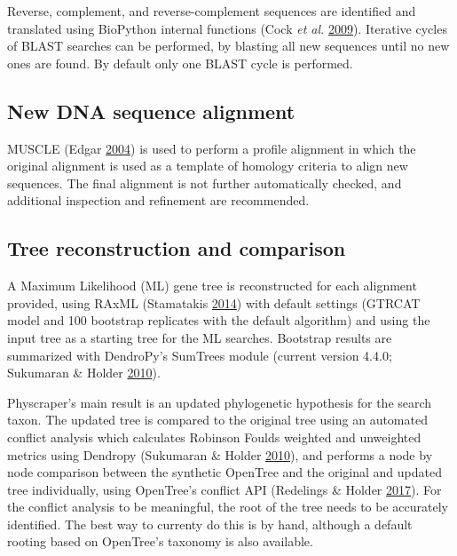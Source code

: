 \documentclass[]{article}
\begin{document}
Reverse, complement, and reverse-complement sequences are identified and translated using BioPython internal functions (Cock \emph{et al.} \protect\hyperlink{ref-cock2009biopython}{2009}).
Iterative cycles of BLAST searches can be performed, by blasting all new sequences until no new ones are found. By default only one BLAST cycle is performed.

\hypertarget{new-dna-sequence-alignment}{%
\subsection{New DNA sequence alignment}\label{new-dna-sequence-alignment}}

MUSCLE (Edgar \protect\hyperlink{ref-edgar2004muscle}{2004}) is used to perform a profile alignment in which the original alignment is used as a template of homology criteria to align new sequences.
The final alignment is not further automatically checked, and additional inspection and refinement are recommended.

\hypertarget{tree-reconstruction-and-comparison}{%
\subsection{Tree reconstruction and comparison}\label{tree-reconstruction-and-comparison}}

A Maximum Likelihood (ML) gene tree is reconstructed for each alignment provided, using RAxML (Stamatakis \protect\hyperlink{ref-stamatakis2014raxml}{2014}) with default settings (GTRCAT model and 100 bootstrap replicates with the default algorithm) and using the input tree as a starting tree for the ML searches.
Bootstrap results are summarized with DendroPy's SumTrees module (current version 4.4.0; Sukumaran \& Holder \protect\hyperlink{ref-sukumaran2010dendropy}{2010}).

Physcraper's main result is an updated phylogenetic hypothesis for the search taxon.
The updated tree is compared to the original tree using an automated conflict analysis which calculates Robinson Foulds weighted and unweighted metrics using Dendropy (Sukumaran \& Holder \protect\hyperlink{ref-sukumaran2010dendropy}{2010}), and performs a node by node comparison between the synthetic OpenTree and the original and updated tree individually, using OpenTree's conflict API (Redelings \& Holder \protect\hyperlink{ref-redelings2017supertree}{2017}).
For the conflict analysis to be meaningful, the root of the tree needs to be accurately identified. The best way to currenty do this is by hand, although a default rooting based on OpenTree's taxonomy is also available.
\end{document}
